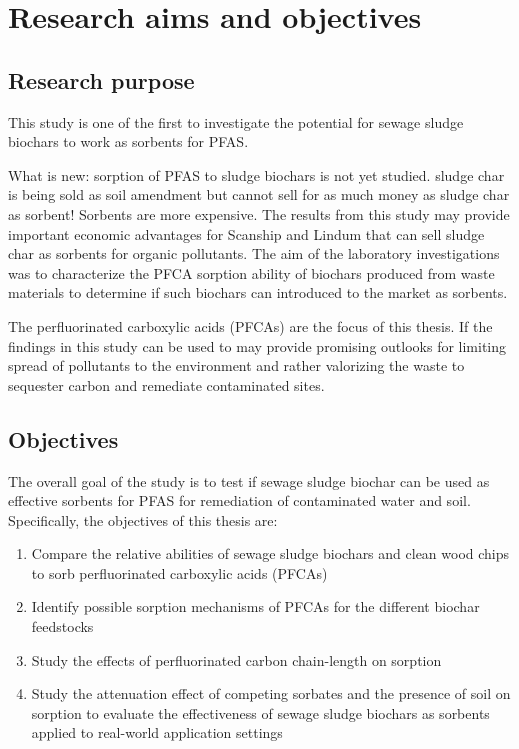 \chapter{Research aims and objectives}\label{chap:Objectives}
\section{Research purpose}\label{sec:purpose}
This study is one of the first to investigate the potential for sewage sludge biochars to work as sorbents for PFAS.

What is new: sorption of PFAS to sludge biochars is not yet studied. sludge char is being sold as soil amendment but cannot sell for as much money as sludge char as sorbent! Sorbents are more expensive. The results from this study may provide important economic advantages for Scanship and Lindum that can sell sludge char as sorbents for organic pollutants. The aim of the laboratory investigations was to characterize the PFCA sorption ability of biochars produced from waste materials to determine if such biochars can introduced to the market as sorbents. 

The perfluorinated carboxylic acids (PFCAs) are the focus of this thesis.
If the findings in this study can be used to may provide promising outlooks for limiting spread of pollutants to the environment and rather valorizing the waste to sequester carbon and remediate contaminated sites. 

\section{Objectives}\label{sec:objectives}
The overall goal of the study is to test if sewage sludge biochar can be used as effective sorbents for PFAS for remediation of contaminated water and soil. Specifically, the objectives of this thesis are:

\begin{enumerate}
    \item{Compare the relative abilities of sewage sludge biochars and clean wood chips to sorb perfluorinated carboxylic acids (PFCAs)}
    \item{Identify possible sorption mechanisms of PFCAs for the different biochar feedstocks}
    \item{Study the effects of perfluorinated carbon chain-length on sorption }
    \item{Study the attenuation effect of competing sorbates and the presence of soil on sorption to evaluate the effectiveness of sewage sludge biochars as sorbents applied to real-world application settings}
\end{enumerate}

